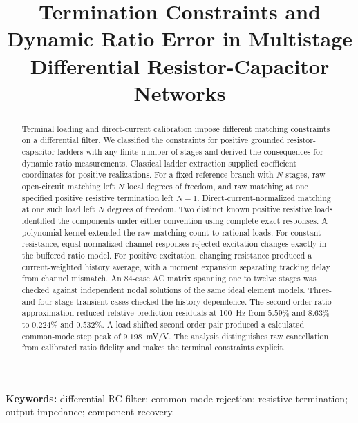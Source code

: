 \documentclass[11pt,a4paper]{article}
\title{Termination Constraints and Dynamic Ratio Error in Multistage Differential Resistor-Capacitor Networks}
\author{}
\date{}
\begin{document}
\maketitle
\begin{abstract}
Terminal loading and direct-current calibration impose different matching constraints on a differential filter. We classified the constraints for positive grounded resistor-capacitor ladders with any finite number of stages and derived the consequences for dynamic ratio measurements. Classical ladder extraction supplied coefficient coordinates for positive realizations. For a fixed reference branch with $N$ stages, raw open-circuit matching left $N$ local degrees of freedom, and raw matching at one specified positive resistive termination left $N-1$. Direct-current-normalized matching at one such load left $N$ degrees of freedom. Two distinct known positive resistive loads identified the components under either convention using complete exact responses. A polynomial kernel extended the raw matching count to rational loads. For constant resistance, equal normalized channel responses rejected excitation changes exactly in the buffered ratio model. For positive excitation, changing resistance produced a current-weighted history average, with a moment expansion separating tracking delay from channel mismatch. An 84-case AC matrix spanning one to twelve stages was checked against independent nodal solutions of the same ideal element models. Three- and four-stage transient cases checked the history dependence. The second-order ratio approximation reduced relative prediction residuals at 100~Hz from $5.59\%$ and $8.63\%$ to $0.224\%$ and $0.532\%$. A load-shifted second-order pair produced a calculated common-mode step peak of $9.198$~mV/V. The analysis distinguishes raw cancellation from calibrated ratio fidelity and makes the terminal constraints explicit.
\end{abstract}
\noindent\textbf{Keywords:} differential RC filter; common-mode rejection; resistive termination; output impedance; component recovery.













\FloatBarrier


\end{document}
